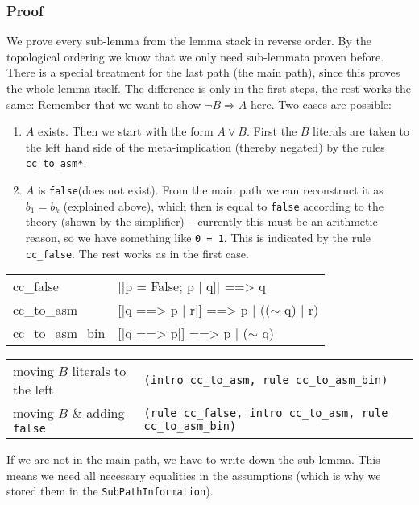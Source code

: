 \documentclass[10pt,a4paper]{article}
\newcommand{\ttt}{\texttt}
\newcommand{\negat}{\ensuremath{\sim}}
\newcommand{\nega}{\negat\xspace}
\newcommand{\LoRa}{\Longrightarrow}
\newcommand{\false}{\ttt{false}\xspace}
\newenvironment{pt}[1]{\begin{center}\begin{tt}\begin{tabular}{#1}\hline}{\end{tabular}\end{tt}\end{center}}
\newcommand{\pl}[1]{#1 \\[1mm]}
\newcommand{\pll}[1]{#1 \\\hline}
\newenvironment{rt}{\begin{center}\begin{tabular}{|l l|}\hline}{\end{tabular}\end{center}}
\newcommand{\rl}[2]{\rm{#1} & \tt{#2} \\[1mm]}
\newcommand{\rll}[2]{\rm{#1} & \tt{#2} \\\hline}
\begin{document}
\subsubsection*{Proof}
We prove every sub-lemma from the lemma stack in reverse order. By the topological ordering we know that we only need sub-lemmata proven before. There is a special treatment for the last path (the main path), since this proves the whole lemma itself. The difference is only in the first steps, the rest works the same: Remember that we want to show $\neg B \LoRa A$ here. Two cases are possible:
%
\begin{enumerate}
	\item $A$ exists. Then we start with the form $A \lor B$. First the $B$ literals are taken to the left hand side of the meta-implication (thereby negated) by the rules \ttt{cc\_to\_asm*}.
	\item $A$ is \false (does not exist). From the main path we can reconstruct it as $b_1 = b_k$ (explained above), which then is equal to \false according to the theory (shown by the simplifier) -- currently this must be an arithmetic reason, so we have something like \ttt{0 = 1}. This is indicated by the rule \ttt{cc\_false}. The rest works as in the first case.
\end{enumerate}
%
\begin{pt}{ll}
	\pl{cc\_false & [|p = False; p | q|] ==> q}
	\pl{cc\_to\_asm & [|q ==> p | r|] ==> p | ((\nega q) | r)}
	\pll{cc\_to\_asm\_bin & [|q ==> p|] ==> p | (\nega q)}
\end{pt}
%
\begin{rt}
	\rl{moving $B$ literals to the left}{(intro cc\_to\_asm, rule cc\_to\_asm\_bin)}
	\rll{moving $B$ \& adding \false}{(rule cc\_false, intro cc\_to\_asm, rule cc\_to\_asm\_bin)}
\end{rt}
%
If we are not in the main path, we have to write down the sub-lemma. This means we need all necessary equalities in the assumptions (which is why we stored them in the \ttt{SubPathInformation}).
\end{document}
